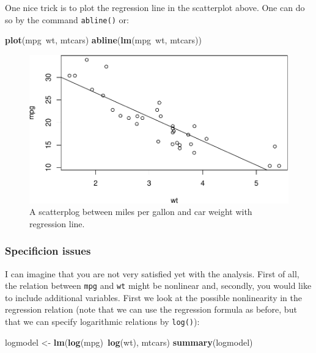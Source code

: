 \documentclass[]{article}
\newenvironment{Shaded}{\begin{snugshade}}{\end{snugshade}}
\newcommand{\KeywordTok}[1]{\textcolor[rgb]{0.13,0.29,0.53}{\textbf{{#1}}}}
\newcommand{\StringTok}[1]{\textcolor[rgb]{0.31,0.60,0.02}{{#1}}}
\newcommand{\NormalTok}[1]{{#1}}
\theoremstyle{definition}
\theoremstyle{definition}
\theoremstyle{definition}
\theoremstyle{remark}
\begin{document}
One nice trick is to plot the regression line in the scatterplot above.
One can do so by the command \texttt{abline()} or:

\begin{Shaded}
\begin{Highlighting}[]
\KeywordTok{plot}\NormalTok{(mpg~wt, mtcars)}
\KeywordTok{abline}\NormalTok{(}\KeywordTok{lm}\NormalTok{(mpg~wt, mtcars))}
\end{Highlighting}
\end{Shaded}

\begin{figure}[htbp]
\centering
\includegraphics{./unnamed-chunk-36-1.pdf}
\caption{\label{fig:unnamed-chunk-36}A scatterplog between miles per gallon
and car weight with regression line.}
\end{figure}

\subsubsection{Specificion issues}\label{specificion-issues}

I can imagine that you are not very satisfied yet with the analysis.
First of all, the relation between \texttt{mpg} and \texttt{wt} might be
nonlinear and, secondly, you would like to include additional variables.
First we look at the possible nonlinearity in the regression relation
(note that we can use the regression formula as before, but that we can
specify logarithmic relations by \texttt{log()}):

\begin{Shaded}
\begin{Highlighting}[]
\NormalTok{logmodel <-}\StringTok{ }\KeywordTok{lm}\NormalTok{(}\KeywordTok{log}\NormalTok{(mpg)~}\KeywordTok{log}\NormalTok{(wt), mtcars)}
\KeywordTok{summary}\NormalTok{(logmodel)}
\end{Highlighting}
\end{Shaded}
\end{document}
